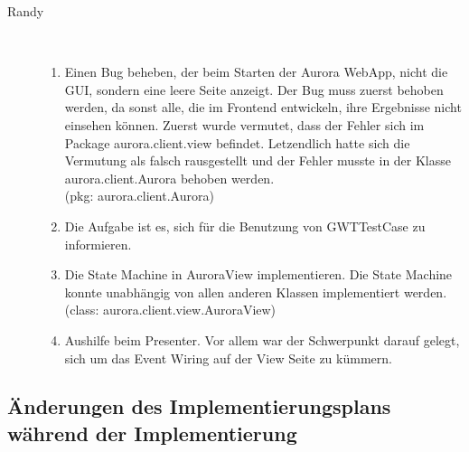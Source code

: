 \documentclass[parskip=full,11pt,twoside]{scrartcl}
\begin{document}
\begin{description}
    \item [Randy]\hfill \\
    \begin{enumerate}
    \item Einen Bug beheben, der beim Starten der Aurora WebApp, nicht die GUI, sondern eine leere Seite anzeigt. Der Bug muss zuerst behoben werden, da sonst alle, die im Frontend entwickeln, ihre Ergebnisse nicht einsehen können. Zuerst wurde vermutet, dass der Fehler sich im Package aurora.client.view befindet. Letzendlich hatte sich die Vermutung als falsch rausgestellt und der Fehler musste in der Klasse aurora.client.Aurora behoben werden. \\(pkg: aurora.client.Aurora)
    \item Die Aufgabe ist es, sich für die Benutzung von GWTTestCase zu informieren. 
    \item Die State Machine in AuroraView implementieren. Die State Machine konnte unabhängig von allen anderen Klassen implementiert werden. \\(class: aurora.client.view.AuroraView) 
    \item Aushilfe beim Presenter. Vor allem war der Schwerpunkt darauf gelegt, sich um das Event Wiring auf der View Seite zu kümmern.
    \end{enumerate}
\end{description}



\subsection{Änderungen des Implementierungsplans während der Implementierung}
\end{document}
